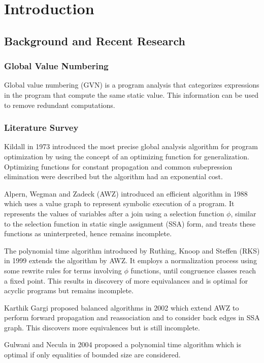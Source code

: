 \chapter{Introduction}

\section{Background and Recent Research}
\subsection{Global Value Numbering}
Global value numbering (GVN) is a program analysis that categorizes expressions in the program that compute the same static value\cite{vandrunen}. This information can be used to remove redundant computations.


\subsection{Literature Survey}
Kildall in 1973\cite{kildall} introduced the most precise global analysis algorithm for program optimization by using the concept of an optimizing function for generalization. Optimizing functions for constant propagation and common subepression elimination were described but the algorithm had an exponential cost.

Alpern, Wegman and Zadeck (AWZ) introduced an efficient algorithm in 1988\cite{awz} which uses a value graph to represent symbolic execution of a program. It represents the values of variables after a join using a selection function $\phi$, similar to the selection function in static single assignment (SSA) form, and treats these functions as uninterpreted, hence remains incomplete.

The polynomial time algorithm introduced by Ruthing, Knoop and Steffen (RKS) in 1999\cite{ruthing} extends the algorithm by AWZ. It employs a normalization process using some rewrite rules for terms involving $\phi$ functions, until congruence classes reach a fixed point. This results in discovery of more equivalances and is optimal for acyclic programs but remains incomplete.

Karthik Gargi proposed balanced algorithms in 2002\cite{gargi} which extend AWZ to perform forward propagation and reassociation and to consider back edges in SSA graph. This discovers more equivalences but is still incomplete.

Gulwani and Necula in 2004\cite{gulwani} proposed a polynomial time algorithm which is optimal if only equalities of bounded size are considered.

